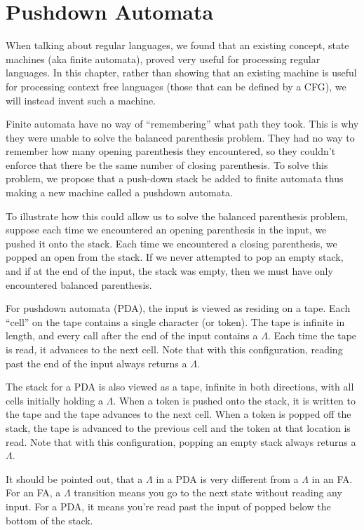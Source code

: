 \documentclass[letterpaper,12pt,openany,reqno]{book}%
\begin{document}
\chapter{Pushdown Automata}
When talking about regular languages, we found that an existing concept, state machines (aka finite automata), proved very useful for processing regular languages. In this chapter, rather than showing that an existing machine is useful for processing context free languages (those that can be defined by a CFG), we will instead invent such a machine.

Finite automata have no way of ``remembering'' what path they took. This is why they were unable to solve the balanced parenthesis problem. They had no way to remember how many opening parenthesis they encountered, so they couldn't enforce that there be the same number of closing parenthesis. To solve this problem, we propose that a push-down stack be added to finite automata thus making a new machine called a pushdown automata.

To illustrate how this could allow us to solve the balanced parenthesis problem, suppose each time we encountered an opening parenthesis in the input, we pushed it onto the stack. Each time we encountered a closing parenthesis, we popped an open from the stack. If we never attempted to pop an empty stack, and if at the end of the input, the stack was empty, then we must have only encountered balanced parenthesis.

For pushdown automata (PDA), the input is viewed as residing on a tape. Each ``cell'' on the tape contains a single character (or token). The tape is infinite in length, and every call after the end of the input contains a $\Lambda$. Each time the tape is read, it advances to the next cell. Note that with this configuration, reading past the end of the input always returns a $\Lambda$.

The stack for a PDA is also viewed as a tape, infinite in both directions, with all cells initially holding a $\Lambda$. When a token is pushed onto the stack, it is written to the tape and the tape advances to the next cell. When a token is popped off the stack, the tape is advanced to the previous cell and the token at that location is read. Note that with this configuration, popping an empty stack always returns a $\Lambda$.

It should be pointed out, that a $\Lambda$ in a PDA is very different from a $\Lambda$ in an FA. For an FA, a $\Lambda$ transition means you go to the next state without reading any input. For a PDA, it means you're read past the input of popped below the bottom of the stack.
\end{document}
